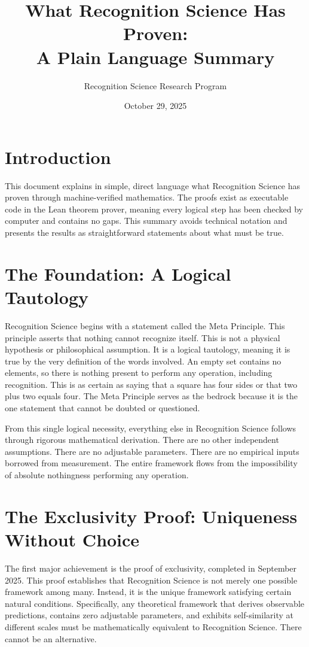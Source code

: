 \documentclass[12pt]{article}
\title{What Recognition Science Has Proven:\\A Plain Language Summary}
\author{Recognition Science Research Program}
\date{October 29, 2025}
\begin{document}
\maketitle

\section*{Introduction}

This document explains in simple, direct language what Recognition Science has proven through machine-verified mathematics. The proofs exist as executable code in the Lean theorem prover, meaning every logical step has been checked by computer and contains no gaps. This summary avoids technical notation and presents the results as straightforward statements about what must be true.

\section{The Foundation: A Logical Tautology}

Recognition Science begins with a statement called the Meta Principle. This principle asserts that nothing cannot recognize itself. This is not a physical hypothesis or philosophical assumption. It is a logical tautology, meaning it is true by the very definition of the words involved. An empty set contains no elements, so there is nothing present to perform any operation, including recognition. This is as certain as saying that a square has four sides or that two plus two equals four. The Meta Principle serves as the bedrock because it is the one statement that cannot be doubted or questioned.

From this single logical necessity, everything else in Recognition Science follows through rigorous mathematical derivation. There are no other independent assumptions. There are no adjustable parameters. There are no empirical inputs borrowed from measurement. The entire framework flows from the impossibility of absolute nothingness performing any operation.

\section{The Exclusivity Proof: Uniqueness Without Choice}

The first major achievement is the proof of exclusivity, completed in September 2025. This proof establishes that Recognition Science is not merely one possible framework among many. Instead, it is the unique framework satisfying certain natural conditions. Specifically, any theoretical framework that derives observable predictions, contains zero adjustable parameters, and exhibits self-similarity at different scales must be mathematically equivalent to Recognition Science. There cannot be an alternative.
\end{document}
